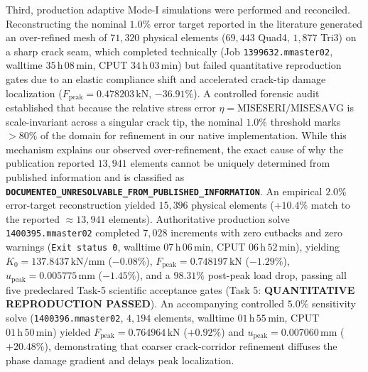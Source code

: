 Third, production adaptive Mode-I simulations were performed and reconciled. Reconstructing the nominal $1.0\%$ error target reported in the literature generated an over-refined mesh of $71{,}320$ physical elements ($69{,}443$ Quad4, $1{,}877$ Tri3) on a sharp crack seam, which completed technically (Job \texttt{1399632.mmaster02}, walltime $35\,\mathrm{h}\,08\,\mathrm{min}$, CPUT $34\,\mathrm{h}\,03\,\mathrm{min}$) but failed quantitative reproduction gates due to an elastic compliance shift and accelerated crack-tip damage localization ($F_{\text{peak}} = 0.478203\,\mathrm{kN}$, $-36.91\%$). A controlled forensic audit established that because the relative stress error $\eta = \text{MISESERI}/\text{MISESAVG}$ is scale-invariant across a singular crack tip, the nominal $1.0\%$ threshold marks $>80\%$ of the domain for refinement in our native implementation. While this mechanism explains our observed over-refinement, the exact cause of why the publication reported $13{,}941$ elements cannot be uniquely determined from published information and is classified as \textbf{\texttt{DOCUMENTED\_UNRESOLVABLE\_FROM\_PUBLISHED\_INFORMATION}}. An empirical $2.0\%$ error-target reconstruction yielded $15{,}396$ physical elements ($+10.4\%$ match to the reported $\approx 13{,}941$ elements). Authoritative production solve \texttt{1400395.mmaster02} completed $7{,}028$ increments with zero cutbacks and zero warnings (\texttt{Exit status 0}, walltime $07\,\mathrm{h}\,06\,\mathrm{min}$, CPUT $06\,\mathrm{h}\,52\,\mathrm{min}$), yielding $K_0 = 137.8437\,\mathrm{kN/mm}$ ($-0.08\%$), $F_{\text{peak}} = 0.748197\,\mathrm{kN}$ ($-1.29\%$), $u_{\text{peak}} = 0.005775\,\mathrm{mm}$ ($-1.45\%$), and a $98.31\%$ post-peak load drop, passing all five predeclared Task-5 scientific acceptance gates (Task 5: \textbf{QUANTITATIVE REPRODUCTION PASSED}). An accompanying controlled $5.0\%$ sensitivity solve (\texttt{1400396.mmaster02}, $4{,}194$ elements, walltime $01\,\mathrm{h}\,55\,\mathrm{min}$, CPUT $01\,\mathrm{h}\,50\,\mathrm{min}$) yielded $F_{\text{peak}} = 0.764964\,\mathrm{kN}$ ($+0.92\%$) and $u_{\text{peak}} = 0.007060\,\mathrm{mm}$ ($+20.48\%$), demonstrating that coarser crack-corridor refinement diffuses the phase damage gradient and delays peak localization.

